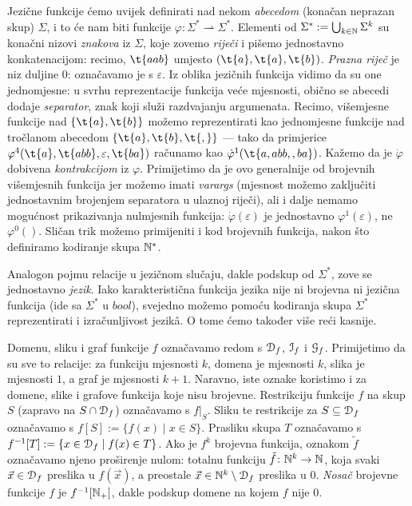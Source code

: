 Jezične funkcije ćemo uvijek definirati nad nekom \emph{abecedom} (konačan neprazan skup) $\Sigma$, i to će nam biti funkcije $\varphi\colon\Sigma^*\rightharpoonup\Sigma^*$. Elementi od $\Sigma^*:=\bigcup_{k\in{\mathbb N}}\Sigma^k$ su konačni nizovi \emph{znakova} iz $\Sigma$, koje zovemo \emph{riječi} i pišemo jednostavno konkatenacijom: recimo, $\t{aab}$ umjesto $(\t{a},\t{a},\t{b})$. \emph{Prazna riječ} je niz duljine $0$: označavamo je s $\varepsilon$. Iz oblika jezičnih funkcija vidimo da su one jednomjesne: u svrhu reprezentacije funkcija veće mjesnosti, obično se abecedi dodaje \emph{separator}, znak koji služi razdvajanju argumenata. Recimo, višemjesne funkcije nad $\{\t{a},\t{b}\}$ možemo reprezentirati kao jednomjesne funkcije nad tročlanom abecedom $\{\t{a},\t{b},\t{,}\}$ --- tako da primjerice $\varphi^4(\t{a},\t{abb},\varepsilon,\t{ba})$ računamo kao $\dot\varphi^1(\t{a{},{}a{}b{}b{},{},{}b{}a})$. Kažemo da je $\dot\varphi$ dobivena \emph{kontrakcijom} iz $\varphi$.
Primijetimo da je ovo generalnije od brojevnih višemjesnih funkcija jer možemo imati \emph{varargs} (mjesnost možemo zaključiti jednostavnim brojenjem separatora u ulaznoj ri\-je\-či), ali i dalje nemamo mogućnost prikazivanja nulmjesnih funkcija: $\dot\varphi(\varepsilon)$ je jednostavno $\varphi^1(\varepsilon)$, ne $\varphi^0()$. Sličan trik možemo primijeniti i kod brojevnih funkcija, nakon što definiramo kodiranje skupa ${\mathbb N}^*$.

Analogon pojmu relacije u jezičnom slučaju, dakle podskup od $\Sigma^*$, zove se jednostavno \emph{jezik}. Iako karakteristična funkcija jezika nije ni brojevna ni jezična funkcija (ide sa $\Sigma^*$ u $bool$), svejedno možemo pomoću kodiranja skupa $\Sigma^*$ reprezentirati i izračunljivost jezikâ. O tome ćemo također više reći kasnije.

Domenu, sliku i graf funkcije $f$ označavamo redom s $\mathcal D_{f}$, $\mathcal I_{f}$ i $\mathcal G_{f}$. Primijetimo da su sve to relacije: za funkciju mjesnosti $k$, domena je mjesnosti $k$, slika je mjesnosti $1$, a graf je mjesnosti $k+1$. Naravno, iste oznake koristimo i za domene, slike i grafove funkcija koje nisu brojevne. Restrikciju funkcije $f$ na skup $S$ (zapravo na $S\cap\mathcal D_{f}$) označavamo s $f|_S$. Sliku te restrikcije za $S\subseteq\mathcal D_{f}$ označavamo s $f[S]:=\{f(x)\mid x\in S\}$. Prasliku skupa $T$ označavamo s $f^{-1}[T]:=\{x\in\mathcal D_{f}\mid f(x)\in T\}$. Ako je $f^k$ brojevna funkcija, oznakom $\tilde f$ označavamo njeno proširenje nulom: totalnu funkciju $\tilde{f}\colon{\mathbb N}^k\to{\mathbb N}$, koja svaki $\vec x\in\mathcal D_{f}$ preslika u $f(\vec x)$, a preostale $\vec x\in{\mathbb N}^k\setminus\mathcal D_{f}$ preslika u $0$. \emph{Nosač} brojevne funkcije $f$ je $f^{-1}[{\mathbb N}_+]$, dakle podskup domene na kojem $f$ nije $0$.

